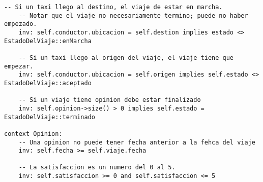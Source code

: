 \begin{lstlisting}[frame=single]
    -- Si un taxi llego al destino, el viaje de estar en marcha.
    -- Notar que el viaje no necesariamente termino; puede no haber empezado.
    inv: self.conductor.ubicacion = self.destion implies estado <> EstadoDelViaje::enMarcha

    -- Si un taxi llego al origen del viaje, el viaje tiene que empezar.
    inv: self.conductor.ubicacion = self.origen implies self.estado <> EstadoDelViaje::aceptado

    -- Si un viaje tiene opinion debe estar finalizado
    inv: self.opinion->size() > 0 implies self.estado = EstadoDelViaje::terminado

context Opinion:
    -- Una opinion no puede tener fecha anterior a la fehca del viaje
    inv: self.fecha >= self.viaje.fecha

    -- La satisfaccion es un numero del 0 al 5.
    inv: self.satisfaccion >= 0 and self.satisfaccion <= 5

\end{lstlisting}

